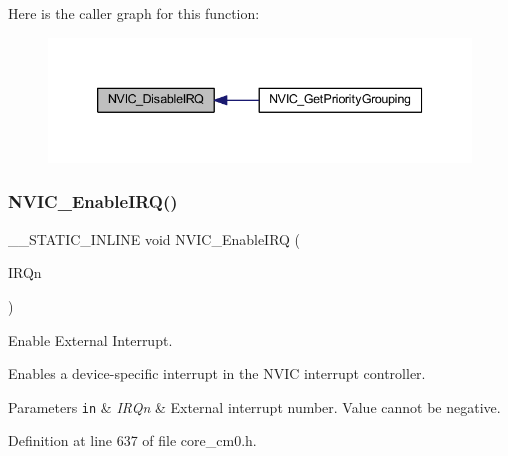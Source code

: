 Here is the caller graph for this function\+:
\nopagebreak
\begin{figure}[H]
\begin{center}
\leavevmode
\includegraphics[width=339pt]{group___c_m_s_i_s___core___n_v_i_c_functions_ga260fba04ac8346855c57f091d4ee1e71_icgraph}
\end{center}
\end{figure}
\mbox{\label{group___c_m_s_i_s___core___n_v_i_c_functions_ga3349f2e3580d7ce22d6530b7294e5921}} 
\subsubsection{\texorpdfstring{N\+V\+I\+C\+\_\+\+Enable\+I\+R\+Q()}{NVIC\_EnableIRQ()}}
{\footnotesize\ttfamily \+\_\+\+\_\+\+S\+T\+A\+T\+I\+C\+\_\+\+I\+N\+L\+I\+NE void N\+V\+I\+C\+\_\+\+Enable\+I\+RQ (\begin{DoxyParamCaption}\item[{\hyperlink{group___configuration__section__for___c_m_s_i_s_gac3af4a32370fb28c4ade8bf2add80251}{I\+R\+Qn\+\_\+\+Type}}]{I\+R\+Qn }\end{DoxyParamCaption})}



Enable External Interrupt. 

Enables a device-\/specific interrupt in the N\+V\+IC interrupt controller. 
\begin{DoxyParams}[1]{Parameters}
\mbox{\tt in}  & {\em I\+R\+Qn} & External interrupt number. Value cannot be negative. \\
\hline
\end{DoxyParams}


Definition at line 637 of file core\+\_\+cm0.\+h.

